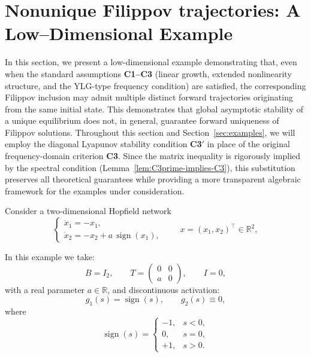 \documentclass[journal]{IEEEtran}
\begin{document}
\section{Nonunique Filippov trajectories:
A Low–Dimensional Example}\label{sec:nonunique}

In this section, we present a low-dimensional example demonstrating that, even when the standard assumptions \textbf{C1--C3} (linear growth, extended nonlinearity structure, and the YLG-type frequency condition) are satisfied, the corresponding Filippov inclusion may admit multiple distinct forward trajectories originating from the same initial state. This demonstrates that global asymptotic stability of a unique equilibrium does not, in general, guarantee forward uniqueness of Filippov solutions. Throughout this section and Section~\ref{sec:examples}, we will employ the diagonal Lyapunov stability condition \textbf{C3$'$} in place of the original frequency-domain criterion \textbf{C3}. Since the matrix inequality is rigorously implied by the spectral condition (Lemma~\ref{lem:C3prime-implies-C3}), this substitution preserves all theoretical guarantees while providing a more transparent algebraic framework for the examples under consideration.

Consider a two-dimensional Hopfield network
\begin{equation}\label{eq:example-system}
\begin{cases}
\dot{x}_{1}=-x_{1},\\
\dot{x}_{2}=-x_{2}+a\,\operatorname{sign}(x_{1}),
\end{cases}
\qquad x=(x_{1},x_{2})^{\top}\in\mathbb{R}^{2},
\end{equation}

In this example we take:
\begin{equation}\label{eq:choice}
B=I_{2},\qquad T=\begin{pmatrix}0&0\\ a&0\end{pmatrix},\qquad I=0,
\end{equation}
with a real parameter $a\in\mathbb{R}$, and discontinuous  activation:
\begin{equation}\label{eq:activation}
g_{1}(s)=\operatorname{sign}(s),\qquad g_{2}(s)\equiv 0,
\end{equation}
where 
\[
\operatorname{sign}(s)=
\begin{cases}
-1,&s<0,\\
0,&s=0,\\
+1,&s>0.
\end{cases}
\]
\end{document}
